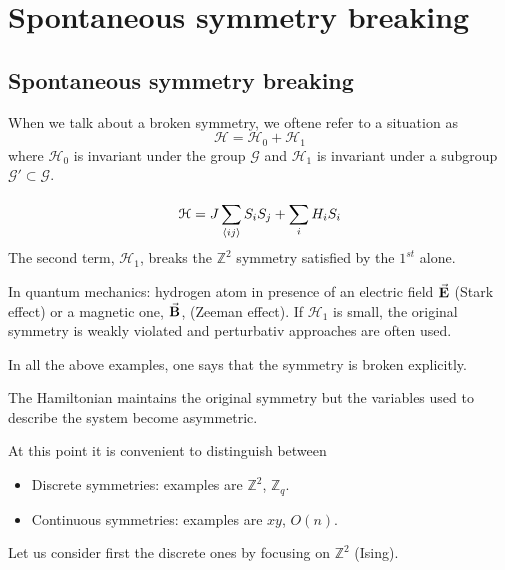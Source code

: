 \documentclass[../main/main.tex]{subfiles}
\begin{document}
\chapter{Spontaneous symmetry breaking}


\section{Spontaneous symmetry breaking}

When we talk about a broken symmetry, we oftene refer to a situation as
\begin{equation}
  \mathcal{H} = \mathcal{H}_0 + \mathcal{H}_1
\end{equation}
where \( \mathcal{H}_0 \)  is invariant under the group \( \mathcal{G} \) and \( \mathcal{H}_1 \) is invariant under a subgroup \( \mathcal{G}' \subset  \mathcal{G}\).
\begin{example}
\begin{equation}
  \mathcal{H} = J \sum_{\expval{ij} }^{} S_i S_j + \sum_{i}^{} H_i S_i
\end{equation}
The second term, \( \mathcal{H}_1 \), breaks the \( \mathbb{Z}^2 \) symmetry satisfied by the \( 1^{st} \) alone.
\end{example}
\begin{example}
In quantum mechanics: hydrogen atom in presence of an electric field \( \va{E} \) (Stark effect) or a magnetic one, \( \va{B} \), (Zeeman effect). If \( \mathcal{H}_1 \) is small, the original symmetry is weakly violated and perturbativ approaches are often used.
\end{example}

In all the above examples, one says that the symmetry is broken explicitly.

\begin{definition}
The Hamiltonian maintains the original symmetry but the variables used to describe the system become asymmetric.
\end{definition}
At this point it is convenient to distinguish between
\begin{itemize}
\item Discrete symmetries: examples are \( \mathbb{Z}^2 \), \( \mathbb{Z}_q \).
\item Continuous symmetries: examples are \( xy \), \( O(n) \).
\end{itemize}
Let us consider first the discrete ones by focusing on \( \mathbb{Z}^2 \) (Ising).
\end{document}
